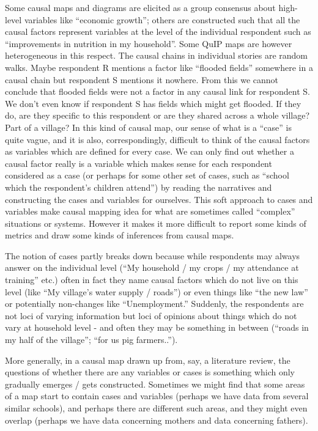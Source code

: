 \documentclass[
]{book}
\begin{document}
Some causal maps and diagrams are elicited as a group consensus about high-level variables like ``economic growth''; others are constructed such that all the causal factors represent variables at the level of the individual respondent such as ``improvements in nutrition in my household''. Some QuIP maps are however heterogeneous in this respect. The causal chains in individual stories are random walks. Maybe respondent R mentions a factor like ``flooded fields'' somewhere in a causal chain but respondent S mentions it nowhere. From this we cannot conclude that flooded fields were not a factor in any causal link for respondent S. We don't even know if respondent S has fields which might get flooded. If they do, are they specific to this respondent or are they shared across a whole village? Part of a village? In this kind of causal map, our sense of what is a ``case'' is quite vague, and it is also, correspondingly, difficult to think of the causal factors as variables which are defined for every case. We can only find out whether a causal factor really is a variable which makes sense for each respondent considered as a case (or perhaps for some other set of cases, such as ``school which the respondent's children attend'') by reading the narratives and constructing the cases and variables for ourselves.
This soft approach to cases and variables make causal mapping idea for what are sometimes called ``complex'' situations or systems. However it makes it more difficult to report some kinds of metrics and draw some kinds of inferences from causal maps.

The notion of cases partly breaks down because while respondents may always answer on the individual level (``My household / my crops / my attendance at training'' etc.) often in fact they name causal factors which do not live on this level (like ``My village's water supply / roads'') or even things like ``the new law'' or potentially non-changes like ``Unemployment.'' Suddenly, the respondents are not loci of varying information but loci of opinions about things which do not vary at household level - and often they may be something in between (``roads in my half of the village''; ``for us pig farmers..'').

More generally, in a causal map drawn up from, say, a literature review, the questions of whether there are any variables or cases is something which only gradually emerges / gets constructed. Sometimes we might find that some areas of a map start to contain cases and variables (perhaps we have data from several similar schools), and perhaps there are different such areas, and they might even overlap (perhaps we have data concerning mothers and data concerning fathers).
\end{document}
